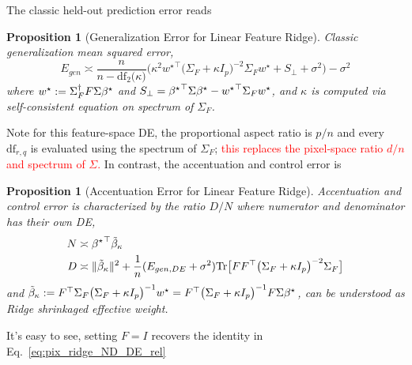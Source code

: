 \documentclass{article}
\newcommand{\red}[1]{\textcolor{red}{#1}}
\providecommand{\propositionname}{Proposition}
\theoremstyle{plain}
\newtheorem{prop}[thm]{\propositionname}
\theoremstyle{definition}
\theoremstyle{remark}
\begin{document}
The classic held-out prediction error reads
\begin{prop}[Generalization Error for Linear Feature Ridge]\label{prop:linfeat_gen_err}
Classic generalization mean squared error,
\begin{equation}
E_{gen}\asymp\frac{n}{n-\mathrm{df}_{2}\bigl(\kappa\bigr)}\Big(\kappa^{2}{w^\star}^{\top}\bigl(\Sigma_{F}+\kappa I_{p}\bigr)^{-2}\Sigma_{F}w^{\star}+S_{\perp}+\sigma^{2}\Big)-\sigma^{2}
\end{equation}
where $w^{\star}:=\Sigma_{F}^{\dagger}F\Sigma{\beta^{\star}}$ and $S_{\perp}={{\beta^{\star}}}^{\top}\Sigma{\beta^{\star}}-{w^\star}^{\top}\Sigma_{F}w^{\star}$, 
and $\kappa$ is computed via self-consistent equation on spectrum
of $\Sigma_{F}$.
\end{prop}
Note for this feature-space DE, the proportional aspect ratio is $p/n$ and every $\mathrm{df}_{r,q}$ is evaluated using the spectrum of $\Sigma_F$; \red{this replaces the pixel-space ratio $d/n$ and spectrum of $\Sigma$.}
In contrast, the accentuation and control error is
\begin{prop}[Accentuation Error for Linear Feature Ridge]\label{prop:linfeat_acc_ND}
Accentuation and control error is characterized by the ratio $D/N$
where numerator and denominator has their own DE,
\begin{align}\label{eq:linfeat_ridge_ND_DE_rel}
N & \asymp{{\beta^{\star}}}^{\top}\tilde{\beta}_{\kappa}\\
D & \asymp\|\tilde{\beta}_{\kappa}\|^{2}+\frac{1}{n}(E_{gen,DE}+\sigma^{2})\mbox{Tr}\bigl[FF^{\top}\bigl(\Sigma_{F}+\kappa I_{p}\bigr)^{-2}\Sigma_{F}\bigr]
\end{align}
and $\tilde{\beta}_{\kappa}:=F^{\top}\Sigma_{F}\bigl(\Sigma_{F}+\kappa I_{p}\bigr)^{-1}w^{\star}=F^{\top}\bigl(\Sigma_{F}+\kappa I_{p}\bigr)^{-1}F\Sigma{\beta^{\star}}$,
can be understood as Ridge shrinkaged effective weight.
\end{prop}
It's easy to see, setting $F=I$ recovers the identity in Eq.~\ref{eq:pix_ridge_ND_DE_rel}
\end{document}
